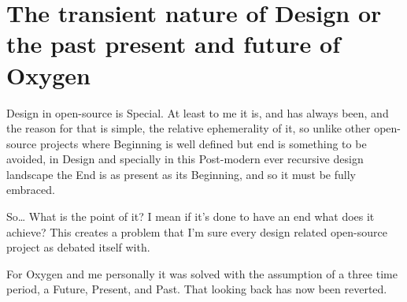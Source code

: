 

\section*{The transient nature of Design or the past present and future of Oxygen}
Design in open-source is Special. At least to me it is, and has always been, and the reason for that is simple, the relative ephemerality of it, so unlike other open-source projects where Beginning is well defined but end is something to be avoided, in Design and specially in this Post-modern ever recursive design landscape the End is as present as its Beginning, and so it must be fully embraced.


So… What is the point of it? I mean if it's done to have an end what does it achieve? This creates a problem that I'm sure every design related open-source project as debated itself with.

For Oxygen and me personally it was solved with the assumption of a three time period, a Future, Present, and Past.  That looking back has now been reverted. 

